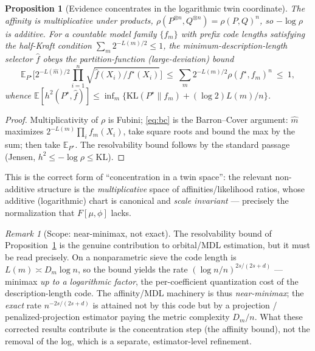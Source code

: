 \documentclass[11pt]{article}
\theoremstyle{plain}
\newtheorem{proposition}[theorem]{Proposition}
\theoremstyle{definition}
\theoremstyle{remark}
\newtheorem{remark}[theorem]{Remark}
\newcommand{\E}{\mathbb{E}}
\newcommand{\KL}{\mathrm{KL}}
\begin{document}
\begin{proposition}[Evidence concentrates in the logarithmic twin coordinate]\label{prop:affinity}
The affinity is multiplicative under products, $\rho(P^{\otimes n},Q^{\otimes
n})=\rho(P,Q)^n$, so $-\log\rho$ is additive. For a countable model family
$\{f_m\}$ with prefix code lengths satisfying the half-Kraft condition
$\sum_m 2^{-L(m)/2}\le 1$, the minimum-description-length selector $\widehat f$
obeys the partition-function (large-deviation) bound
\begin{equation}\label{eq:bc}
\E_{P^\star}\!\Big[2^{-L(\widehat m)/2}\textstyle\prod_{i=1}^n\sqrt{\widehat f(X_i)/f^\star(X_i)}\Big]
\ \le\ \sum_m 2^{-L(m)/2}\rho(f^\star,f_m)^n\ \le\ 1,
\end{equation}
whence $\E[h^2(P^\star,\widehat f)]\le\inf_m\{\KL(P^\star\|f_m)+(\log2)L(m)/n\}$.
\end{proposition}

\begin{proof}
Multiplicativity of $\rho$ is Fubini; \eqref{eq:bc} is the Barron--Cover
argument: $\widehat m$ maximizes $2^{-L(m)}\prod_i f_m(X_i)$, take square roots
and bound the max by the sum; then take $\E_{P^\star}$. The resolvability bound
follows by the standard passage (Jensen, $h^2\le-\log\rho\le\KL$).
\end{proof}

This is the correct form of ``concentration in a twin space'': the relevant
non-additive structure is the \emph{multiplicative} space of affinities/likelihood
ratios, whose additive (logarithmic) chart is canonical and \emph{scale
invariant} --- precisely the normalization that $F[\mu,\phi]$ lacks.

\begin{remark}[Scope: near-minimax, not exact]
The resolvability bound of Proposition~\ref{prop:affinity} is the genuine
contribution to orbital/MDL estimation, but it must be read precisely. On a
nonparametric sieve the code length is $L(m)\asymp D_m\log n$, so the bound yields
the rate $(\log n/n)^{2s/(2s+d)}$ --- minimax \emph{up to a logarithmic factor},
the per-coefficient quantization cost of the description-length code. The
affinity/MDL machinery is thus \emph{near-minimax}; the \emph{exact} rate
$n^{-2s/(2s+d)}$ is attained not by this code but by a projection /
penalized-projection estimator paying the metric complexity $D_m/n$. What these
corrected results contribute is the concentration step (the affinity bound), not
the removal of the log, which is a separate, estimator-level refinement.
\end{remark}
\end{document}
